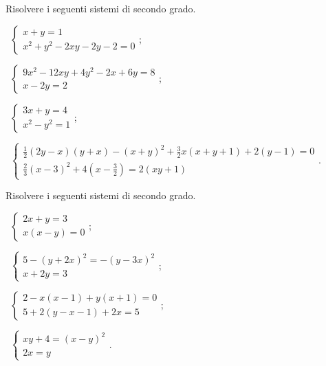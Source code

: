 \begin{esercizio}[\Ast]
 \label{ese:6.10}
Risolvere i seguenti sistemi di secondo grado.
 \begin{enumeratea}
 \item~$\left\{\begin{array}{l}x+y=1\\x^2+y^2-2xy-2y-2=0\end{array}\right.$;
 \item~$\left\{\begin{array}{l}9x^2-12xy+4y^2-2x+6y=8\\x-2y=2\end{array}\right.$;
 \item~$\left\{\begin{array}{l}3x+y=4\\x^2-y^2=1\end{array}\right.$;
 \item~$\left\{\begin{array}{l}\frac 1 2(2y-x)(y+x)-(x+y)^2+\frac 3 2x(x+y+1)+2(y-1)=0\\\frac 2 3(x-3)^2+4\left(x-\frac 3 2\right)=2({xy}+1)\end{array}\right.$.
 \end{enumeratea}
\end{esercizio}

\begin{esercizio}[\Ast]
\label{ese:6.11}
Risolvere i seguenti sistemi di secondo grado.
\begin{multicols}{2}
 \begin{enumeratea}
 \item~$\left\{\begin{array}{l}2x+y=3\\x(x-y)=0\end{array}\right.$;
 \item~$\left\{\begin{array}{l}5-(y+2x)^{2}=-(y-3x)^{2}\\x+2y=3\end{array}\right.$;
 \item~$\left\{\begin{array}{l}2-x(x-1)+y(x+1)=0\\5+2(y-x-1)+2x=5\end{array}\right.$;
 \item~$\left\{\begin{array}{l}xy+4=(x-y)^{2}\\2x=y\end{array}\right.$.
 \end{enumeratea}
 \end{multicols}
\end{esercizio}

